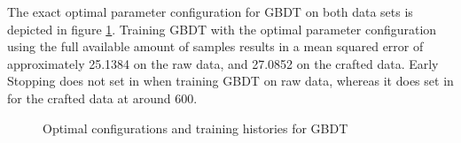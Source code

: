 The exact optimal parameter configuration for GBDT on both data sets is depicted in figure \ref{fig:GBDT_Optimal}. Training GBDT with the optimal parameter configuration using the full available amount of samples results in a mean squared error of approximately 25.1384 on the raw data, and 27.0852 on the crafted data. Early Stopping does not set in when training GBDT on raw data, whereas it does set in for the crafted data at around 600. 
\begin{figure}[h]
	\centering
	\caption{Optimal configurations and training histories for GBDT}
	\label{fig:GBDT_Optimal}
\end{figure}

